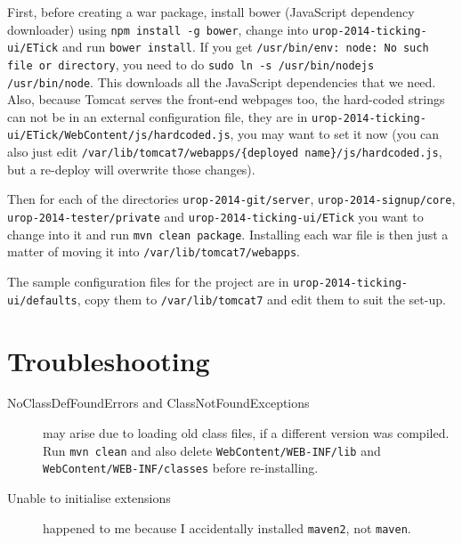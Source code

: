 \documentclass[12pt,a4paper]{article}
\newcommand{\tomcatwd}{{\tt /var/\hspace{0pt}lib/\hspace{0pt}tomcat7}}
\newcommand{\localHardcodedJs}{{\tt urop-2014-ticking-ui/\hspace{0pt}ETick/\hspace{0pt}WebContent/\hspace{0pt}js/\hspace{0pt}hardcoded.js}}
\newcommand{\deployedHardcodedJs}{\tomcatwd{\tt/\hspace{0pt}webapps/\hspace{0pt}\{deployed name\}/\hspace{0pt}js/\hspace{0pt}hardcoded.js}}
\begin{document}
First, before creating a war package, install bower (JavaScript dependency downloader) using {\tt npm install -g bower}, change into {\tt urop-2014-ticking-ui/ETick} and run {\tt bower install}.
If you get {\tt /usr/bin/env: node: No such file or directory}, you need to do {\tt sudo ln -s /usr/bin/nodejs /usr/bin/node}.
This downloads all the JavaScript dependencies that we need.
Also, because Tomcat serves the front-end webpages too, the hard-coded strings can not be in an external configuration file, they are in \localHardcodedJs, you may want to set it now (you can also just edit \deployedHardcodedJs, but a re-deploy will overwrite those changes).

Then for each of the directories {\tt urop-2014-git/server}, {\tt urop-2014-signup/core}, {\tt urop-2014-tester/private} and {\tt urop-2014-ticking-ui/ETick} you want to change into it and run {\tt mvn clean package}.
Installing each war file is then just a matter of moving it into \tomcatwd{}{\tt/webapps}.

The sample configuration files for the project are in {\tt urop-2014-ticking-ui/defaults}, copy them to \tomcatwd{}{} and edit them to suit the set-up.

\section{Troubleshooting}
\begin{description}
  \item[NoClassDefFoundError{\rm s and} ClassNotFoundException{\rm s}] may arise due to loading old class files, if a different version was compiled. Run {\tt mvn clean} and also delete {\tt WebContent/WEB-INF/lib} and {\tt WebContent/WEB-INF/classes} before re-installing.

  \item[Unable to initialise extensions] happened to me because I accidentally installed {\tt maven2}, not {\tt maven}.

\end{description}
\end{document}
